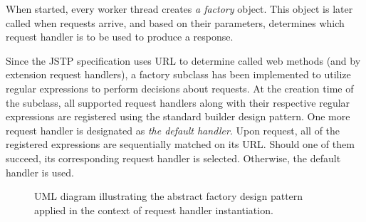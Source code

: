 When started, every worker thread creates \textit{a factory} object. This object is later called when requests arrive, and based on their parameters, determines which request handler is to be used to produce a response.

Since the JSTP specification uses URL to determine called web methods (and by extension request handlers), a factory subclass has been implemented to utilize regular expressions to perform decisions about requests. At the creation time of the subclass, all supported request handlers along with their respective regular expressions are registered using the standard builder design pattern. One more request handler is designated as \textit{the default handler}. Upon request, all of the registered expressions are sequentially matched on its URL. Should one of them succeed, its corresponding request handler is selected. Otherwise, the default handler is used.

\begin{figure}[t]
\begin{center}

\caption{UML diagram illustrating the abstract factory design pattern applied in the context of request handler instantiation.}
\label{fig:handler-factory}
\end{center}
\end{figure}

